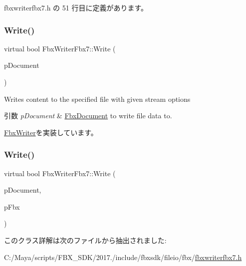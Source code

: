  fbxwriterfbx7.\+h の 51 行目に定義があります。

\mbox{\label{class_fbx_writer_fbx7_abc9fcf2cf7e1ed96f87bdc67f05f9545}} 
\subsubsection{\texorpdfstring{Write()}{Write()}\hspace{0.1cm}{\footnotesize\ttfamily [1/2]}}
{\footnotesize\ttfamily virtual bool Fbx\+Writer\+Fbx7\+::\+Write (\begin{DoxyParamCaption}\item[{\hyperlink{class_fbx_document}{Fbx\+Document} $\ast$}]{p\+Document }\end{DoxyParamCaption})\hspace{0.3cm}{\ttfamily [virtual]}}

Writes content to the specified file with given stream options 
\begin{DoxyParams}{引数}
{\em p\+Document} & \hyperlink{class_fbx_document}{Fbx\+Document} to write file data to. \\
\hline
\end{DoxyParams}


\hyperlink{class_fbx_writer_aa8c0277611da0fdb0b9a184c55c30c2c}{Fbx\+Writer}を実装しています。

\mbox{\label{class_fbx_writer_fbx7_a4e20df937a566f3b5eb68427808354f9}} 
\subsubsection{\texorpdfstring{Write()}{Write()}\hspace{0.1cm}{\footnotesize\ttfamily [2/2]}}
{\footnotesize\ttfamily virtual bool Fbx\+Writer\+Fbx7\+::\+Write (\begin{DoxyParamCaption}\item[{\hyperlink{class_fbx_document}{Fbx\+Document} $\ast$}]{p\+Document,  }\item[{\hyperlink{class_fbx_i_o}{Fbx\+IO} $\ast$}]{p\+Fbx }\end{DoxyParamCaption})\hspace{0.3cm}{\ttfamily [virtual]}}



このクラス詳解は次のファイルから抽出されました\+:\begin{DoxyCompactItemize}
\item 
C\+:/\+Maya/scripts/\+F\+B\+X\+\_\+\+S\+D\+K/2017./include/fbxsdk/fileio/fbx/\hyperlink{fbxwriterfbx7_8h}{fbxwriterfbx7.\+h}\end{DoxyCompactItemize}
